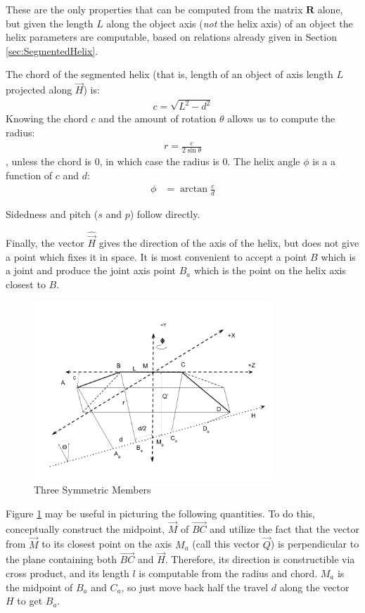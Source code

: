 \documentclass[11pt]{article}
\begin{document}
{These are the only properties that can be computed from the
matrix $\bm{R}$ alone, but given the length $L$ along the
object axis ({\em not} the helix axis) of an object
the helix parameters are computable, based on relations
already given in Section \ref{sec:SegmentedHelix}.

The chord of the segmented helix (that is, length of an object of
axis length $L$
projected along $\overrightarrow{H}$) is:
\begin{align}
  c = \sqrt{L^2 - d^2}
\end{align}
Knowing the chord $c$ and the amount of rotation $\theta$
allows us to compute the radius:
\begin{align}
  r = \frac{c}{2 \sin{\theta}}
\end{align},
unless the chord is $0$, in which case the radius is $0$.
The helix angle $\phi$ is a a function of $c$ and $d$:
\begin{align}
    \phi &= \arctan{\frac{c}{d}}
\end{align}

Sidedness and pitch ($s$ and $p$) follow directly.

Finally, the vector $\hat{\overrightarrow{H}}$ gives the direction of the
axis of the helix, but does not give a point which fixes
it in space. It is most convenient to accept a point $B$
which is a joint and produce the joint axis point $B_a$ which is the
point on the helix axis closest to $B$.

\begin{figure}
     \centering
     \includegraphics[width=0.80\textwidth]{figures/ThreeMemberDiagram.png}
     \caption{Three Symmetric Members}
  \label{fig:threemembersdiagram}
\end{figure}


Figure \ref{fig:threemembersdiagram}
may be useful in picturing the following quantities.
To do this, conceptually construct the midpoint,
$\overrightarrow{M}$
of $\overrightarrow{BC}$ and utilize the fact that the vector
from $\overrightarrow{M}$ to its closest point on the axis $M_a$ (call this vector $\overrightarrow{Q}$) is perpendicular
to the plane containing both $\overrightarrow{BC}$ and $\overrightarrow{H}$. Therefore,
its direction is constructible via cross product, and
its length $l$ is computable from the radius and chord. $M_a$
is the midpoint of $B_a$ and $C_a$, so just move back
half the travel $d$ along the vector $H$ to get $B_a$.

}
\end{document}

